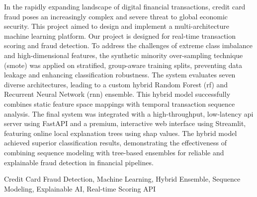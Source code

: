 \setlength{\parskip}{1em}
In the rapidly expanding landscape of digital financial transactions, credit card fraud poses an increasingly complex and severe threat to global economic security. This project aimed to design and implement a multi-architecture machine learning platform. Our project is designed for real-time transaction scoring and fraud detection. To address the challenges of extreme class imbalance and high-dimensional features, the synthetic minority over-sampling technique (\gls{smote}) was applied on stratified, group-aware training splits, preventing data leakage and enhancing classification robustness. The system evaluates seven diverse architectures, leading to a custom hybrid Random Forest (\gls{rf}) and Recurrent Neural Network (\gls{rnn}) ensemble. This hybrid model successfully combines static feature space mappings with temporal transaction sequence analysis. The final system was integrated with a high-throughput, low-latency \gls{api} server using FastAPI and a premium, interactive web interface using Streamlit, featuring online local explanation trees using \gls{shap} values. The hybrid model achieved superior classification results, demonstrating the effectiveness of combining sequence modeling with tree-based ensembles for reliable and explainable fraud detection in financial pipelines.

\begin{keywords}
Credit Card Fraud Detection, Machine Learning, Hybrid Ensemble, Sequence Modeling, Explainable AI, Real-time Scoring API
\end{keywords}
